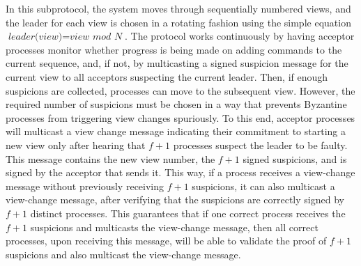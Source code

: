 In this subprotocol, the system moves through sequentially numbered views, and the leader for each view is chosen in a rotating fashion using the simple equation $\textit{leader(view)}=\textit{view mod N}$. The protocol works continuously by having acceptor processes monitor whether progress is being made on adding commands to the current sequence, and, if not, by multicasting a signed {\sc suspicion} message for the current view to all acceptors suspecting the current leader. Then, if enough suspicions are collected, processes can move to the subsequent view. However, the required number of suspicions must be chosen in a way that prevents Byzantine processes from triggering view changes spuriously. To this end, acceptor processes will multicast a view change message indicating their commitment to starting a new view only after hearing that $f+1$ processes suspect the leader to be faulty. This message contains the new view number, the $f+1$ signed suspicions, and is signed by the acceptor that sends it. This way, if a process receives a view-change message without previously receiving $f+1$ suspicions, it can also multicast a view-change message, after verifying that the suspicions are correctly signed by $f+1$ distinct processes.
This guarantees that if one correct process receives the $f+1$ suspicions and multicasts the view-change message, then all correct processes, upon receiving this message, will be able to validate the proof of $f+1$ suspicions and also multicast the view-change message.\par
